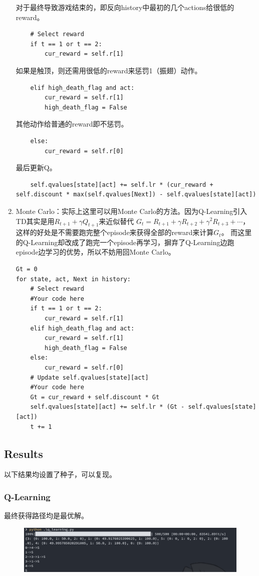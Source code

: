 \documentclass[a4paper, 11pt]{article}
\begin{document}
\begin{enumerate}
对于最终导致游戏结束的，即反向history中最初的几个actions给很低的reward。
\begin{lstlisting}
	# Select reward
	if t == 1 or t == 2:
		cur_reward = self.r[1]
\end{lstlisting}
如果是触顶，则还需用很低的reward来惩罚1（振翅）动作。
\begin{lstlisting}
	elif high_death_flag and act:
		cur_reward = self.r[1]
		high_death_flag = False
\end{lstlisting}
其他动作给普通的reward即不惩罚。
\begin{lstlisting}
	else:
		cur_reward = self.r[0]
\end{lstlisting}
最后更新Q。
\begin{lstlisting}
	self.qvalues[state][act] += self.lr * (cur_reward + self.discount * max(self.qvalues[Next]) - self.qvalues[state][act])
\end{lstlisting}
\item Monte Carlo：实际上这里可以用Monte Carlo的方法。因为Q-Learning引入TD其实是用$R_{t+1}+\gamma Q_{t+1}$来近似替代
$G_t=R_{t+1}+\gamma R_{t+2}+\gamma^2R_{t+3}+\cdots$，这样的好处是不需要跑完整个episode来获得全部的reward来计算$G_t$。
而这里的Q-Learning却改成了跑完一个episode再学习，摒弃了Q-Learning边跑episode边学习的优势，所以不妨用回Monte Carlo。
\begin{lstlisting}
Gt = 0 
for state, act, Next in history:
	# Select reward
	#Your code here
	if t == 1 or t == 2:
		cur_reward = self.r[1]
	elif high_death_flag and act:
		cur_reward = self.r[1]
		high_death_flag = False
	else:
		cur_reward = self.r[0]
	# Update self.qvalues[state][act]
	#Your code here
	Gt = cur_reward + self.discount * Gt
	self.qvalues[state][act] += self.lr * (Gt - self.qvalues[state][act])
	t += 1
\end{lstlisting}
\end{enumerate}
\subsection{Results}
以下结果均设置了种子，可以复现。
\subsubsection{Q-Learning}
最终获得路径均是最优解。
\begin{figure}[H]
\centering
\includegraphics[width=16cm]{Pic/q_learning.png}
\end{figure}
\end{document}
